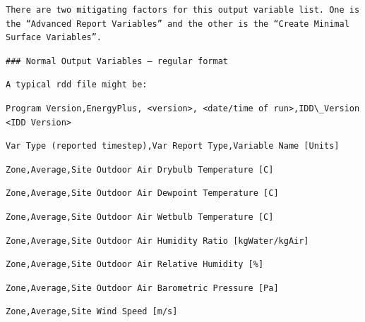 \begin{lstlisting}
There are two mitigating factors for this output variable list. One is the “Advanced Report Variables” and the other is the “Create Minimal Surface Variables”.
\end{lstlisting}

\begin{lstlisting}
### Normal Output Variables – regular format
\end{lstlisting}

\begin{lstlisting}
A typical rdd file might be:
\end{lstlisting}

\begin{lstlisting}
Program Version,EnergyPlus, <version>, <date/time of run>,IDD\_Version <IDD Version>
\end{lstlisting}

\begin{lstlisting}
Var Type (reported timestep),Var Report Type,Variable Name [Units]
\end{lstlisting}

\begin{lstlisting}
Zone,Average,Site Outdoor Air Drybulb Temperature [C]
\end{lstlisting}

\begin{lstlisting}
Zone,Average,Site Outdoor Air Dewpoint Temperature [C]
\end{lstlisting}

\begin{lstlisting}
Zone,Average,Site Outdoor Air Wetbulb Temperature [C]
\end{lstlisting}

\begin{lstlisting}
Zone,Average,Site Outdoor Air Humidity Ratio [kgWater/kgAir]
\end{lstlisting}

\begin{lstlisting}
Zone,Average,Site Outdoor Air Relative Humidity [%]
\end{lstlisting}

\begin{lstlisting}
Zone,Average,Site Outdoor Air Barometric Pressure [Pa]
\end{lstlisting}

\begin{lstlisting}
Zone,Average,Site Wind Speed [m/s]
\end{lstlisting}

